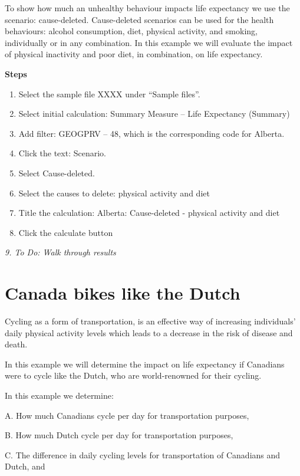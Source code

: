 \documentclass[]{book}
\begin{document}
To show how much an unhealthy behaviour impacts life expectancy we use
the scenario: cause-deleted. Cause-deleted scenarios can be used for the
health behaviours: alcohol consumption, diet, physical activity, and
smoking, individually or in any combination. In this example we will
evaluate the impact of physical inactivity and poor diet, in
combination, on life expectancy.

\textbf{Steps}

\begin{enumerate}
\def\labelenumi{\arabic{enumi}.}
\item
  Select the sample file XXXX under ``Sample files''.
\item
  Select initial calculation: Summary Measure -- Life Expectancy
  (Summary)
\item
  Add filter: GEOGPRV -- 48, which is the corresponding code for
  Alberta.
\item
  Click the text: Scenario.
\item
  Select Cause-deleted.
\item
  Select the causes to delete: physical activity and diet
\item
  Title the calculation: Alberta: Cause-deleted - physical activity and
  diet
\item
  Click the calculate button
\end{enumerate}

\emph{9. To Do: Walk through results}

\section{Canada bikes like the Dutch}\label{canada-bikes-like-the-dutch}

Cycling as a form of transportation, is an effective way of increasing
individuals' daily physical activity levels which leads to a decrease in
the risk of disease and death.

In this example we will determine the impact on life expectancy if
Canadians were to cycle like the Dutch, who are world-renowned for their
cycling.

In this example we determine:

A. How much Canadians cycle per day for transportation purposes,

B. How much Dutch cycle per day for transportation purposes,

C. The difference in daily cycling levels for transportation of
Canadians and Dutch, and
\end{document}
